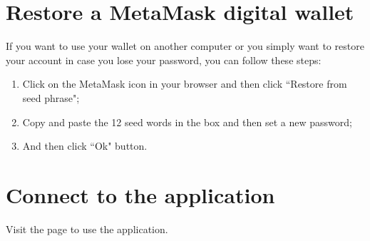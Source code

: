 \documentclass[ManualeUtente]{subfiles}
\begin{document}
\section{Restore a MetaMask digital wallet}
If you want to use your wallet on another computer or you simply want to restore your account in case you lose your password, you can follow these steps:
\begin{enumerate}
	\item Click on the MetaMask icon in your browser and then click \textquotedblleft Restore from seed phrase";
	\item Copy and paste the 12 seed words in the box and then set a new password;
	\item And then click \textquotedblleft Ok" button.
\end{enumerate}

\section{Connect to the application}
Visit the page  to use the application.
\end{document}
